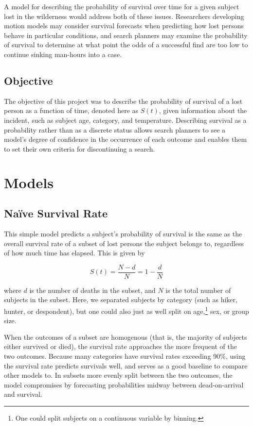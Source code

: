 \documentclass[12pt,titlepage]{article}
\begin{document}
      A model for describing the probability of survival over time for a given
      subject lost in the wilderness would address both of these issues.
      Researchers developing motion models may consider survival forecasts when
      predicting how lost persons behave in particular conditions, and search
      planners may examine the probability of survival to determine at what
      point the odds of a successful find are too low to continue sinking
      man-hours into a case.

    \subsection{Objective}
      The objective of this project was to describe the probability of survival
      of a lost person as a function of time, denoted here as $S(t)$, given
      information about the incident, such as subject age, category, and
      temperature. Describing survival as a probability rather than as a
      discrete status allows search planners to see a model's degree of
      confidence in the occurrence of each outcome and enables them to set
      their own criteria for discontinuing a search.

  \section{Models}

    \subsection{Na{\"i}ve Survival Rate}
      This simple model predicts a subject's probability of survival is the
      same as the overall survival rate of a subset of lost persons the subject
      belongs to, regardless of how much time has elapsed. This is given by

      $$S(t) = \frac{N - d}{N} = 1 - \frac{d}{N}$$

      where $d$ is the number of deaths in the subset, and $N$ is the total
      number of subjects in the subset. Here, we separated subjects by
      category (such as hiker, hunter, or despondent), but one could also just
      as well split on age,\footnote{One could split subjects on a continuous
      variable by binning.} sex, or group size.

      When the outcomes of a subset are homogenous (that is, the majority of
      subjects either survived or died), the survival rate approaches the
      more frequent of the two outcomes. Because many categories have
      survival rates exceeding 90\%, using the survival rate predicts
      survivals well, and serves as a good baseline to compare other models to.
      In subsets more evenly split between the two outcomes, the model
      compromises by forecasting probabilities midway between dead-on-arrival
      and survival.
\end{document}
